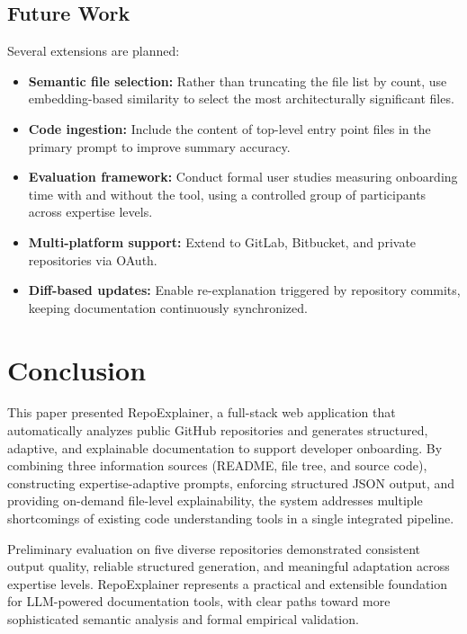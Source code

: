 \documentclass[conference]{IEEEtran}
\begin{document}
\subsection{Future Work}

Several extensions are planned:

\begin{itemize}
    \item \textbf{Semantic file selection:} Rather than truncating the file list by count, use embedding-based similarity to select the most architecturally significant files.
    \item \textbf{Code ingestion:} Include the content of top-level entry point files in the primary prompt to improve summary accuracy.
    \item \textbf{Evaluation framework:} Conduct formal user studies measuring onboarding time with and without the tool, using a controlled group of participants across expertise levels.
    \item \textbf{Multi-platform support:} Extend to GitLab, Bitbucket, and private repositories via OAuth.
    \item \textbf{Diff-based updates:} Enable re-explanation triggered by repository commits, keeping documentation continuously synchronized.
\end{itemize}

\section{Conclusion}

This paper presented RepoExplainer, a full-stack web application that automatically analyzes public GitHub repositories and generates structured, adaptive, and explainable documentation to support developer onboarding. By combining three information sources (README, file tree, and source code), constructing expertise-adaptive prompts, enforcing structured JSON output, and providing on-demand file-level explainability, the system addresses multiple shortcomings of existing code understanding tools in a single integrated pipeline.

Preliminary evaluation on five diverse repositories demonstrated consistent output quality, reliable structured generation, and meaningful adaptation across expertise levels. RepoExplainer represents a practical and extensible foundation for LLM-powered documentation tools, with clear paths toward more sophisticated semantic analysis and formal empirical validation.
\end{document}
